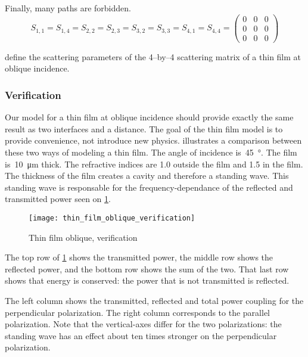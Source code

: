 Finally, many paths are forbidden.
\begin{equation}
    S_{1, 1} = S_{1, 4} = S_{2, 2} = S_{2, 3} =
    S_{3, 2} = S_{3, 3} = S_{4, 1} = S_{4, 4} = 
    \begin{pmatrix}
        0&0&0\\0&0&0\\0&0&0
    \end{pmatrix}
    \label{eq:thin_film_s_zero}
\end{equation}

 define the scattering parameters of the 4--by--4 scattering matrix of a thin film at oblique incidence.


\subsubsection{Verification}
Our model for a thin film at oblique incidence should provide exactly the same result as two interfaces and a distance.
The goal of the thin film model is to provide convenience, not introduce new physics.
 illustrates a comparison between these two ways of modeling a thin film.
The angle of incidence is~\SI{45}{\degree}.
The film is~\SI{10}{\micro\meter} thick.
The refractive indices are 1.0 outside the film and 1.5 in the film.
The thickness of the film creates a cavity and therefore a standing wave.
This standing wave is responsable for the frequency-dependance of the reflected and transmitted power seen on \cref{fig:thin_film_oblique_verification}.

\begin{figure}[hbtp]
    \centering
    \texttt{[image: thin\_film\_oblique\_verification]}
    \caption{Thin film oblique, verification}
    \label{fig:thin_film_oblique_verification}
\end{figure}

The top row of \cref{fig:thin_film_oblique_verification} shows the transmitted power, the middle row shows the reflected power, and the bottom row shows the sum of the two.
That last row shows that energy is conserved: the power that is not transmitted is reflected.

The left column shows the transmitted, reflected and total power coupling for the perpendicular polarization.
The right column corresponds to the parallel polarization.
Note that the vertical-axes differ for the two polarizations: the standing wave has an effect about ten times stronger on the perpendicular polarization.

